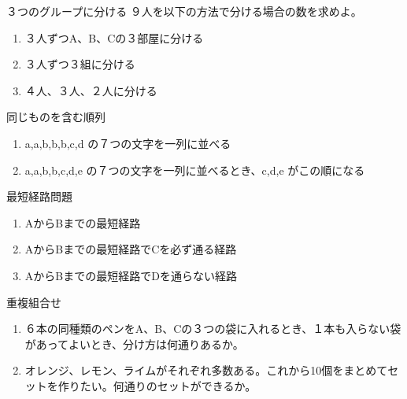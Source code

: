 \documentclass[10pt,dvipdfmx]{jsarticle}
\begin{document}
\begin{itembox}[l]{３つのグループに分ける}
  ９人を以下の方法で分ける場合の数を求めよ。
  \begin{enumerate}
    \item ３人ずつA、B、Cの３部屋に分ける
    \item ３人ずつ３組に分ける
    \item ４人、３人、２人に分ける
  \end{enumerate}
\end{itembox}
\begin{itembox}[l]{同じものを含む順列}
  \begin{enumerate}
    \item a,a,b,b,b,c,d の７つの文字を一列に並べる
    \item a,a,b,b,c,d,e の７つの文字を一列に並べるとき、c,d,e がこの順になる
  \end{enumerate}
\end{itembox}
\begin{itembox}[l]{最短経路問題}
  \begin{minipage}{0.7\textwidth}
    \begin{enumerate}
      \item AからBまでの最短経路
      \item AからBまでの最短経路でCを必ず通る経路
      \item AからBまでの最短経路でDを通らない経路
    \end{enumerate}
  \end{minipage}
  \begin{minipage}{0.2\textwidth}
  \end{minipage}


\end{itembox}
\begin{itembox}[l]{重複組合せ}
  \begin{enumerate}
    \item ６本の同種類のペンをA、B、Cの３つの袋に入れるとき、１本も入らない袋があってよいとき、分け方は何通りあるか。
    \item オレンジ、レモン、ライムがそれぞれ多数ある。これから10個をまとめてセットを作りたい。何通りのセットができるか。
  \end{enumerate}
\end{itembox}
\end{document}
